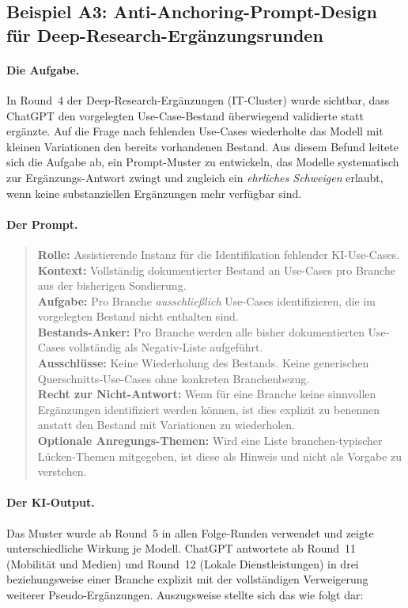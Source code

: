 \documentclass[a4paper,11pt]{article}
\begin{document}
\subsection{Beispiel A3: Anti-Anchoring-Prompt-Design für Deep-Research-Ergänzungsrunden}

\paragraph{Die Aufgabe.}
In Round~4 der Deep-Research-Ergänzungen (IT-Cluster) wurde sichtbar,
dass ChatGPT den vorgelegten Use-Case-Bestand überwiegend validierte
statt ergänzte. Auf die Frage nach fehlenden Use-Cases wiederholte das
Modell mit kleinen Variationen den bereits vorhandenen Bestand. Aus
diesem Befund leitete sich die Aufgabe ab, ein Prompt-Muster zu
entwickeln, das Modelle systematisch zur Ergänzungs-Antwort zwingt und
zugleich ein \emph{ehrliches Schweigen} erlaubt, wenn keine
substanziellen Ergänzungen mehr verfügbar sind.

\paragraph{Der Prompt.}
\begin{quote}
\textbf{Rolle:} Assistierende Instanz für die Identifikation fehlender
KI-Use-Cases.\\
\textbf{Kontext:} Vollständig dokumentierter Bestand an Use-Cases pro
Branche aus der bisherigen Sondierung.\\
\textbf{Aufgabe:} Pro Branche \emph{ausschließlich} Use-Cases
identifizieren, die im vorgelegten Bestand nicht enthalten sind.\\
\textbf{Bestands-Anker:} Pro Branche werden alle bisher dokumentierten
Use-Cases vollständig als Negativ-Liste aufgeführt.\\
\textbf{Ausschlüsse:} Keine Wiederholung des Bestands. Keine
generischen Querschnitts-Use-Cases ohne konkreten Branchenbezug.\\
\textbf{Recht zur Nicht-Antwort:} Wenn für eine Branche keine
sinnvollen Ergänzungen identifiziert werden können, ist dies explizit
zu benennen anstatt den Bestand mit Variationen zu wiederholen.\\
\textbf{Optionale Anregungs-Themen:} Wird eine Liste branchen-typischer
Lücken-Themen mitgegeben, ist diese als Hinweis und nicht als Vorgabe
zu verstehen.
\end{quote}

\paragraph{Der KI-Output.}
Das Muster wurde ab Round~5 in allen Folge-Runden verwendet und
zeigte unterschiedliche Wirkung je Modell. ChatGPT antwortete ab
Round~11 (Mobilität und Medien) und Round~12 (Lokale Dienstleistungen)
in drei beziehungsweise einer Branche explizit mit der vollständigen
Verweigerung weiterer Pseudo-Ergänzungen. Auszugsweise stellte sich
das wie folgt dar:
\end{document}
